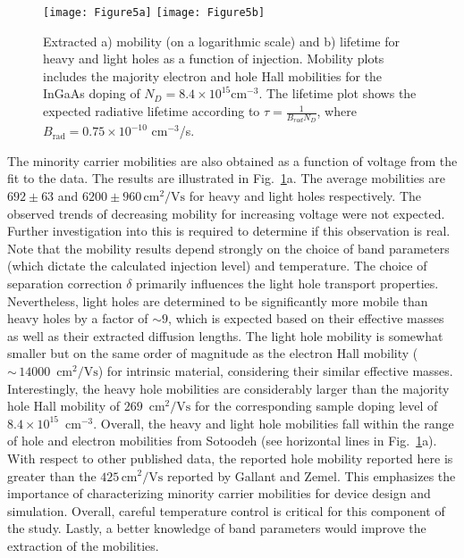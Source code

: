 \documentclass[aip,amsmath,amssymb,reprint]{revtex4-1}
\begin{document}
  \begin{figure} [t]
   \begin{center}
    \texttt{[image: Figure5a]}
    \texttt{[image: Figure5b]}
    \end{center}
    \caption[example]
    { \label{fig:fig-5}
 Extracted a) mobility (on a logarithmic scale) and b) lifetime for heavy and light holes as a function of injection. Mobility plots includes the majority electron and hole Hall mobilities\cite{Sotoodeh} for the InGaAs doping of $N_D = 8.4 \times 10^{15} \text{cm}^{-3}$. The lifetime plot shows the expected radiative lifetime according to $\tau = \frac{1}{B_{rad}N_{D}}$, where $B_{\text{rad}}=0.75\times 10^{-10}\text{ cm}^{-3}$/s.}
    \end{figure}

The minority carrier mobilities are also obtained as a function of voltage from the fit to the data. The results are illustrated in Fig.~\ref{fig:fig-5}a. The average mobilities are $692\pm63$ and $6200\pm960\, \text{cm}^{2}\text{/Vs}$ for heavy and light holes respectively.
 The observed trends of decreasing mobility for increasing voltage were not expected.
 Further investigation into this is required to determine if this observation is real. Note that the mobility results depend strongly on the choice of band parameters (which dictate the calculated injection level) and temperature.
 The choice of separation correction $\delta$ primarily influences the light hole transport properties.
 Nevertheless, light holes are determined to be significantly more mobile than heavy holes by a factor of ${\sim}9$, which is expected based on their effective masses as well as their extracted diffusion lengths.
 The light hole mobility is somewhat smaller but on the same order of magnitude as the electron Hall mobility (${\sim}\,14000\, \text{ cm}^2/\text{Vs}$) for intrinsic material,\cite{Sotoodeh} considering their similar effective masses.
 Interestingly, the heavy hole mobilities are considerably larger than the majority hole Hall mobility of $269\, \text{ cm}^2/\text{Vs}$ for the corresponding sample doping level of $8.4\times 10^{15}\, \text{ cm}^{-3}$.\cite{Sotoodeh}
 Overall, the heavy and light hole mobilities fall within the range of hole and electron mobilities from Sotoodeh (see horizontal lines in Fig.~\ref{fig:fig-5}a).
 With respect to other published data, the reported hole mobility reported here is greater than the $425\, \text{cm}^{2}\text{/Vs}$ reported by Gallant and Zemel.\cite{Gallant}
 This emphasizes the importance of characterizing minority carrier mobilities for device design and simulation.
 Overall, careful temperature control is critical for this component of the study.
 Lastly, a better knowledge of band parameters would improve the extraction of the mobilities. 
\end{document}
